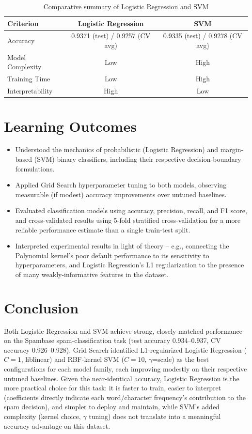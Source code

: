 \documentclass[12pt,a4paper]{article}
\begin{document}
\begin{table}[H]
\centering
\begin{tabular}{lcc}
\toprule
Criterion & Logistic Regression & SVM \\
\midrule
Accuracy & 0.9371 (test) / 0.9257 (CV avg) & 0.9335 (test) / 0.9278 (CV avg) \\
Model Complexity & Low & High \\
Training Time & Low & High \\
Interpretability & High & Low \\
\bottomrule
\end{tabular}
\caption{Comparative summary of Logistic Regression and SVM}
\end{table}

\section{Learning Outcomes}
\begin{itemize}
\item Understood the mechanics of probabilistic (Logistic Regression) and margin-based (SVM)
binary classifiers, including their respective decision-boundary formulations.
\item Applied Grid Search hyperparameter tuning to both models, observing measurable (if modest)
accuracy improvements over untuned baselines.
\item Evaluated classification models using accuracy, precision, recall, and F1 score, and
cross-validated results using 5-fold stratified cross-validation for a more reliable performance
estimate than a single train-test split.
\item Interpreted experimental results in light of theory -- e.g., connecting the Polynomial
kernel's poor default performance to its sensitivity to hyperparameters, and Logistic Regression's
L1 regularization to the presence of many weakly-informative features in the dataset.
\end{itemize}

\section{Conclusion}
Both Logistic Regression and SVM achieve strong, closely-matched performance on the Spambase
spam-classification task (test accuracy 0.934--0.937, CV accuracy 0.926--0.928). Grid Search
identified L1-regularized Logistic Regression ($C=1$, liblinear) and RBF-kernel SVM ($C=10$,
$\gamma$=scale) as the best configurations for each model family, each improving modestly on
their respective untuned baselines. Given the near-identical accuracy, Logistic Regression is the
more practical choice for this task: it is faster to train, easier to interpret (coefficients
directly indicate each word/character frequency's contribution to the spam decision), and simpler
to deploy and maintain, while SVM's added complexity (kernel choice, $\gamma$ tuning) does not
translate into a meaningful accuracy advantage on this dataset.
\end{document}
